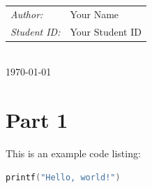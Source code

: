 \documentclass[12pt,a4paper]{report}
\begin{document}
\begin{titlepage}
    \begin{minipage}{0.4\textwidth}
        \begin{tabular}{l l}
            \emph{Author:\quad}     & Your Name       \\
            \emph{Student ID:\quad} & Your Student ID \\
        \end{tabular}

    \end{minipage}\\[2cm]


    {\large \today}\\[2cm]
    \vfill
\end{titlepage}


\tableofcontents
\newpage



\pagestyle{mypagestyle}


\section{Part 1}

This is an example code listing:

\begin{lstlisting}[language=C++, caption=Example C++ code]
printf("Hello, world!")
\end{lstlisting}
\end{document}
